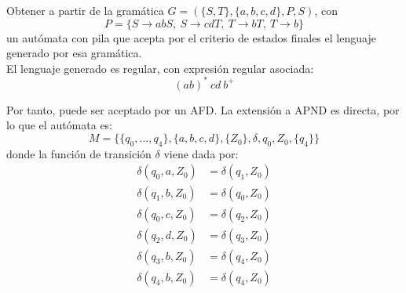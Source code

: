 \begin{ejercicio}\label{ej:1.5.3}
    Obtener a partir de la gramática $G=(\{S,T\},\{a,b,c,d\},P,S)$, con
    \begin{equation*}
        P = \{S\rightarrow abS,\ S\rightarrow cdT,\ T\rightarrow bT,\ T\rightarrow b\}
    \end{equation*}
    un autómata con pila que acepta por el criterio de estados finales el lenguaje generado por esa gramática.\\

    El lenguaje generado es regular, con expresión regular asociada:
    \begin{equation*}
        (ab)^*~cd~b^+
    \end{equation*}

    Por tanto, puede ser aceptado por un AFD. La extensión a APND es directa, por lo que el autómata es:
    \begin{equation*}
        M=\{\{q_0,\dots,q_4\}, \{a,b,c,d\},\{Z_0\},\delta,q_0,Z_0,\{q_4\}\}
    \end{equation*}
    donde la función de transición $\delta$ viene dada por:
    \begin{align*}
        \delta(q_0,a,Z_0)&=\delta(q_1,Z_0)\\
        \delta(q_1,b,Z_0)&=\delta(q_0,Z_0)\\
        \delta(q_0,c,Z_0)&=\delta(q_2,Z_0)\\
        \delta(q_2,d,Z_0)&=\delta(q_3,Z_0)\\
        \delta(q_3,b,Z_0)&=\delta(q_4,Z_0)\\
        \delta(q_4,b,Z_0)&=\delta(q_4,Z_0)\\
    \end{align*}
\end{ejercicio}

